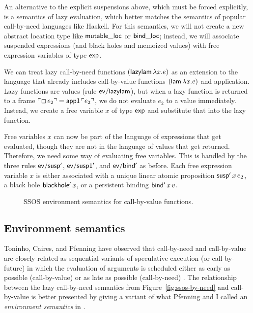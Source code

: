 An alternative to the explicit suspensions above, which must be forced
explicitly, is a semantics of lazy evaluation, which better matches
the semantics of popular call-by-need languages like Haskell. For this
semantics, we will not create a new abstract location type like ${\sf
  mutable\_loc}$ or ${\sf bind\_loc}$; instead, we will associate 
suspended expressions (and black holes and memoized values) with
free expression variables of type ${\sf exp}$.

We can treat lazy call-by-need functions $({\sf lazylam}\,\lambda
x.e)$ as an extension to the language that already includes
call-by-value functions $({\sf lam}\,\lambda x.e)$ and
application. Lazy functions are values (rule ${\sf ev/lazylam}$), but
when a lazy function is returned to a frame ${\ulcorner{\Box\,e_2}\urcorner} = {\sf
  app1}\,{\ulcorner{e_2}\urcorner}$, we do not evaluate $e_2$ to a value
immediately. Instead, we create a free variable $x$ of type ${\sf
  exp}$ and substitute that into the lazy function.

Free variables $x$ can now be part of the language of expressions that
get evaluated, though they are not in the language of values that get
returned. Therefore, we need some way of evaluating free
variables. This is handled by the three rules ${\sf ev/susp'}$, ${\sf
  ev/susp1'}$, and ${\sf ev/bind'}$ as before. Each free expression
variable $x$ is either associated with a unique linear atomic
proposition ${\sf susp'}\,x\,e_2$, a black hole ${\sf blackhole'}\,x$,
or a persistent binding ${\sf bind'}\,x\,v$.

\begin{figure}
\caption{SSOS environment semantics for call-by-value functions.}
\label{fig:ssos-by-env}
\end{figure}


\subsection{Environment semantics}

Toninho, Caires, and Pfenning have observed that call-by-need and
call-by-value are closely related as sequential variants of
speculative execution (or call-by-future) in which the evaluation of
arguments is scheduled either as early as possible (call-by-value) or
as late as possible (call-by-need) \cite{toninho12functions}. The
relationship between the lazy call-by-need semantics from
Figure~\ref{fig:ssos-by-need} and call-by-value is better presented by
giving a variant of what Pfenning and I called an {\it environment
  semantics} in \cite{pfenning09substructural}.


